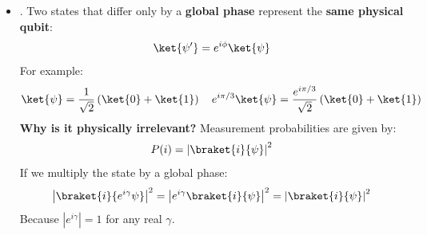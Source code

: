 \begin{itemize}
\begin{figure}[!htp]
{
        }
        \caption{Analogy between the unit circle $S^1$, the ordinary sphere $S^2$, and the 3-sphere $S^3$. The normalized qubit state lives on $S^3$ because it is specified by four real coordinates constrained by one equation. In this figure, we can only visualize $S^1$ and $S^2$, while $S^3$ cannot be directly drawn in three-dimensional space, so we represent it with a dashed ellipse to indicate that it is a higher-dimensional object.}
        \label{fig:s1-s2-s3-analogy}
    \end{figure}


    \newpage
    
    
    \item {}\label{sec:global-phase-equivalence} . Two states that differ only by a \textbf{global phase} represent the \textbf{same physical qubit}:
    \begin{equation*}
        \ket{\psi'} = e^{i\phi}\ket{\psi}
    \end{equation*}
    For example:
    \begin{equation*}
        \ket{\psi} = \frac{1}{\sqrt{2}}\left(\ket{0} + \ket{1}\right)
        \quad
        e^{i \pi / 3} \ket{\psi} = \frac{e^{i \pi / 3}}{\sqrt{2}}\left(\ket{0} + \ket{1}\right)
    \end{equation*}
    \textcolor{Green3}{ \textbf{Why is it physically irrelevant?}} Measurement probabilities are given by:
    \begin{equation*}
        P(i) = \left|\braket{i}{\psi}\right|^2
    \end{equation*}
    If we multiply the state by a global phase:
    \begin{equation*}
        \left|\braket{i}{e^{i\gamma}\psi}\right|^{2} =
        \left|e^{i\gamma} \braket{i}{\psi}\right|^{2} =
        \left|\braket{i}{\psi}\right|^{2}
    \end{equation*}
    Because $\left|e^{i\gamma}\right| = 1$ for any real $\gamma$.


\end{itemize}
